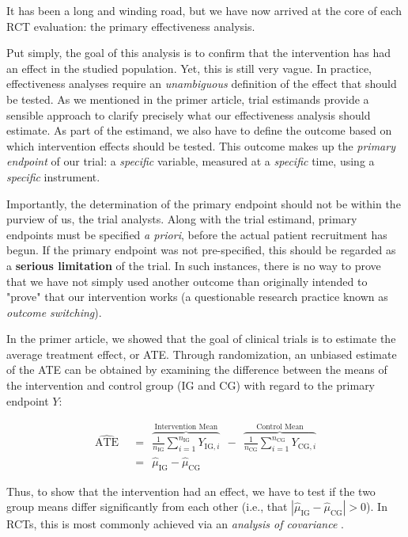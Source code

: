 It has been a long and winding road, but we have now arrived at the core of each RCT evaluation: the primary effectiveness analysis. 

Put simply, the goal of this analysis is to confirm that the intervention has had an effect in the studied population. Yet, this is still very vague. In practice, effectiveness analyses require an \emph{unambiguous} definition of the effect that should be tested. As we mentioned in the primer article,  trial estimands provide a sensible approach to clarify precisely what our effectiveness analysis should estimate. As part of the estimand, we also have to define the outcome based on which intervention effects should be tested. This outcome makes up the \emph{primary endpoint} of our trial: a \emph{specific} variable, measured at a \emph{specific} time, using a \emph{specific} instrument.

Importantly, the determination of the primary endpoint should not be within the purview of us, the trial analysts. Along with the trial estimand, primary endpoints must be specified \emph{a priori}, before the actual patient recruitment has begun. If the primary endpoint was not pre-specified, this should be regarded as a \textbf{serious limitation} of the trial. In such instances, there is no way to prove that we have not simply used another outcome than originally intended to "prove" that our intervention works (a questionable research practice known as \emph{outcome switching}).

In the primer article, we showed that the goal of clinical trials is to estimate the average treatment effect, or ATE. Through randomization, an unbiased estimate of the ATE can be obtained by examining the difference between the means of the intervention and control group (IG and CG) with regard to the primary endpoint $Y$:

\begin{align}
\widehat{\text{ATE}} ~~ &= ~~\overbrace{\frac{1}{n_{\text{IG}}} \sum^{n_{\text{IG}}}_{i=1} Y_{\text{IG},i}}^{\text{Intervention Mean}} ~~ - ~~ \overbrace{\frac{1}{n_{\text{CG}}} \sum^{n_{\text{CG}}}_{i=1} Y_{\text{CG},i}}^{\text{Control Mean}} \\
&= ~~ \hat{\mu}_{\text{IG}} - \hat{\mu}_{\text{CG}}
\end{align}

Thus, to show that the intervention had an effect, we have to test if the two group means differ significantly from each other (i.e., that $|\hat{\mu}_{\text{IG}} - \hat{\mu}_{\text{CG}}| > 0$). In RCTs, this is most commonly achieved via an \emph{analysis of covariance} \citep[ANCOVA;][chap. 15.3, 2.9]{montgomery2017design, dunn2018generalized}. 


